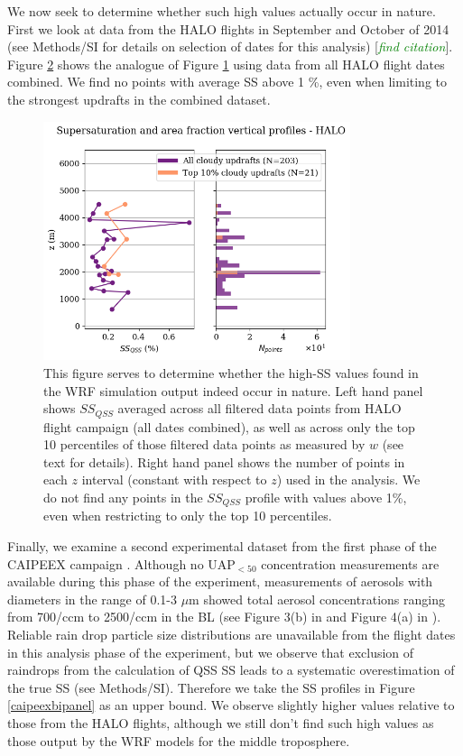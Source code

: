 \documentclass{article}
\newcommand{\todo}[1]{\textcolor{green}{\textit{#1}}}
\begin{document}
\begin{figure}[ht]
	\label{wrfbipanel}
\end{figure}

\clearpage
\newpage

We now seek to determine whether such high values actually occur in nature. First we look at data from the HALO flights in September and October of 2014 (see Methods/SI for details on selection of dates for this analysis) [\todo{find citation}]. Figure \ref{halobipanel} shows the analogue of Figure \ref{wrfbipanel} using data from all HALO flight dates combined. We find no points with average SS above 1 \%, even when limiting to the strongest updrafts in the combined dataset.

\begin{figure}[ht]
    \centering
    \includegraphics[width=9cm]{revhalo/v8_FINAL_combined_bipanel_ss_qss_vs_z_figure.png}
    \caption{This figure serves to determine whether the high-SS values found in the WRF simulation output indeed occur in nature. Left hand panel shows $SS_{QSS}$ averaged across all filtered data points from HALO flight campaign (all dates combined), as well as across only the top 10 percentiles of those filtered data points as measured by $w$ (see text for details). Right hand panel shows the number of points in each $z$ interval (constant with respect to $z$) used in the analysis. We do not find any points in the $SS_{QSS}$ profile with values above 1\%, even when restricting to only the top 10 percentiles.}
    \label{halobipanel}
\end{figure}

Finally, we examine a second experimental dataset from the first phase of the CAIPEEX campaign \cite{Kulkarni2012}. Although no UAP$_{<50}$ concentration measurements are available during this phase of the experiment, measurements of aerosols with diameters in the range of 0.1-3 $\mu$m showed total aerosol concentrations ranging from 700/ccm to 2500/ccm in the BL (see Figure 3(b) in \cite{Prabha2011} and Figure 4(a) in \cite{Kulkarni2012}). Reliable rain drop particle size distributions are unavailable from the flight dates in this analysis phase of the experiment, but we observe that exclusion of raindrops from the calculation of QSS SS leads to a systematic overestimation of the true SS (see Methods/SI). Therefore we take the SS profiles in Figure \ref{caipeexbipanel} as an upper bound. We observe slightly higher values relative to those from the HALO flights, although we still don't find such high values as those output by the WRF models for the middle troposphere.
\end{document}
